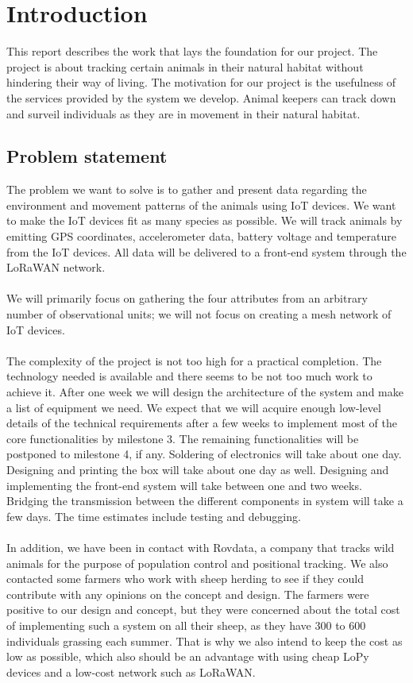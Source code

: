 \tableofcontents
\listoffigures

\clearpage

\section{Introduction}
	This report describes the work that lays the foundation for our project. The project is about tracking certain animals in their natural habitat without hindering their way of living. The motivation for our project is the usefulness of the services provided by the system we develop. Animal keepers can track down and surveil individuals as they are in movement in their natural habitat.

	\subsection{Problem statement}
		The problem we want to solve is to gather and present data regarding the environment and movement patterns of the animals using IoT devices. We want to make the IoT devices fit as many species as possible. We will track animals by emitting GPS coordinates, accelerometer data, battery voltage and temperature from the IoT devices. All data will be delivered to a front-end system through the LoRaWAN network. 
		\\\\
		We will primarily focus on gathering the four attributes from an arbitrary number of observational units; we will not focus on creating a mesh network of IoT devices. 
		\\\\
		The complexity of the project is not too high for a practical completion. The technology needed is available and there seems to be not too much work to achieve it. After one week we will design the architecture of the system and make a list of equipment we need. We expect that we will acquire enough low-level details of the technical requirements after a few weeks to implement most of the core functionalities by milestone 3. The remaining functionalities will be postponed to milestone 4, if any. Soldering of electronics will take about one day. Designing and printing the box will take about one day as well. Designing and implementing the front-end system will take between one and two weeks. Bridging the transmission between the different components in system will take a few days. The time estimates include testing and debugging. 
		\\\\
		In addition, we have been in contact with Rovdata, a company that tracks wild animals for the purpose of population control and positional tracking. We also contacted some farmers who work with sheep herding to see if they could contribute with any opinions on the concept and design. The farmers were positive to our design and concept, but they were concerned about the total cost of implementing such a system on all their sheep, as they have 300 to 600 individuals grassing each summer. That is why we also intend to keep the cost as low as possible, which also should be an advantage with using cheap LoPy devices and a low-cost network such as LoRaWAN. 


